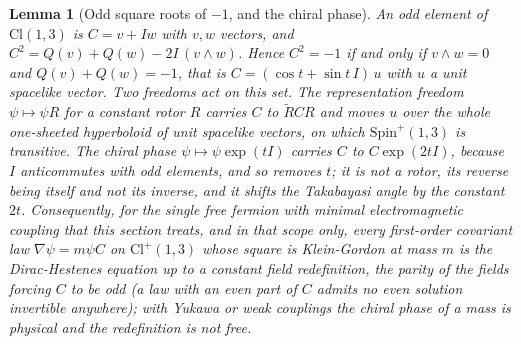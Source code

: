 \documentclass[11pt]{article}
\newtheorem{lemma}[theorem]{Lemma}
\theoremstyle{definition}
\theoremstyle{plain}
\newcommand{\changedmark}[2]{\marginpar{\raggedright\scriptsize\color{#1}#2}}
\providecommand{\Cl}{}\renewcommand{\Cl}{\mathrm{Cl}}
\begin{document}
\begin{lemma}[Odd square roots of $-1$, and the chiral phase]\label{c:one-relation.odd-square-roots-chiral-phase}
\changedmark{gray}{reworded}
An odd element of $\Cl(1,3)$ is $C = v + Iw$ with $v, w$ vectors, and $C^{2} = Q(v) + Q(w) - 2I\,(v \wedge w)$. Hence $C^{2} = -1$ if and only if $v \wedge w = 0$ and $Q(v) + Q(w) = -1$, that is $C = (\cos t + \sin t\, I)\,u$ with $u$ a unit spacelike vector. Two freedoms act on this set. The representation freedom $\psi \mapsto \psi R$ for a constant rotor $R$ carries $C$ to $\tilde{R}CR$ and moves $u$ over the whole one-sheeted hyperboloid of unit spacelike vectors, on which $\mathrm{Spin}^{+}(1,3)$ is transitive. The chiral phase $\psi \mapsto \psi\exp(tI)$ carries $C$ to $C\exp(2tI)$, because $I$ anticommutes with odd elements, and so removes $t$; it is not a rotor, its reverse being itself and not its inverse, and it shifts the Takabayasi angle by the constant $2t$. Consequently, for the single free fermion with minimal electromagnetic coupling that this section treats, and in that scope only, every first-order covariant law $\nabla\psi = m\psi C$ on $\Cl^{+}(1,3)$ whose square is Klein-Gordon at mass $m$ is the Dirac-Hestenes equation up to a constant field redefinition, the parity of the fields forcing $C$ to be odd (a law with an even part of $C$ admits no even solution invertible anywhere); with Yukawa or weak couplings the chiral phase of a mass is physical and the redefinition is not free.
\end{lemma}
\end{document}

